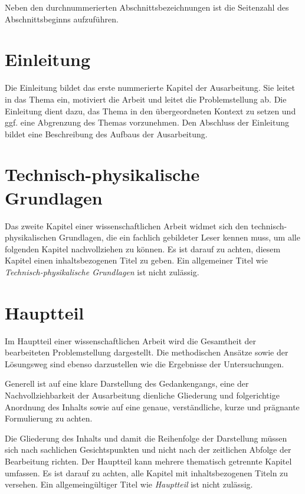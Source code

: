 Neben den durchnummerierten Abschnittsbezeichnungen ist die Seitenzahl des Abschnittsbeginns aufzuführen.

\section{Einleitung}
\label{sec:Einleitung}

Die Einleitung bildet das erste nummerierte Kapitel der Ausarbeitung. Sie leitet in das Thema ein, motiviert die Arbeit und leitet die Problemstellung ab. Die Einleitung dient dazu, das Thema in den übergeordneten Kontext zu setzen und ggf. eine Abgrenzung des Themas vorzunehmen. Den Abschluss der Einleitung bildet eine Beschreibung des Aufbaus der Ausarbeitung.

\section{Technisch-physikalische Grundlagen}
\label{sec:Grundlagen}

Das zweite Kapitel einer wissenschaftlichen Arbeit widmet sich den technisch-physikalischen Grundlagen, die ein fachlich gebildeter Leser kennen muss, um alle folgenden Kapitel nachvollziehen zu können. Es ist darauf zu achten, diesem Kapitel einen inhaltsbezogenen Titel zu geben. Ein allgemeiner Titel wie \textit{Technisch-physikalische Grundlagen} ist nicht zulässig.

\section{Hauptteil}
\label{sec:Hauptteil}

Im Hauptteil einer wissenschaftlichen Arbeit wird die Gesamtheit der bearbeiteten Problemstellung dargestellt. Die methodischen Ansätze sowie der Lösungsweg sind ebenso darzustellen wie die Ergebnisse der Untersuchungen. 

Generell ist auf eine klare Darstellung des Gedankengangs, eine der Nachvollziehbarkeit der Ausarbeitung dienliche Gliederung und folgerichtige Anordnung des Inhalts sowie auf eine genaue, verständliche, kurze und prägnante Formulierung zu achten.

Die Gliederung des Inhalts und damit die Reihenfolge der Darstellung müssen sich nach sachlichen Gesichtspunkten und nicht nach der zeitlichen Abfolge der Bearbeitung richten. Der Hauptteil kann mehrere thematisch getrennte Kapitel umfassen. Es ist darauf zu achten, alle Kapitel mit inhaltsbezogenen Titeln zu versehen. Ein allgemeingültiger Titel wie \textit{Hauptteil} ist nicht zulässig.

